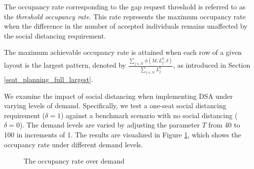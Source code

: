 The occupancy rate corresponding to the gap request threshold is referred to as the \textit{threshold occupancy rate}. This rate represents the maximum occupancy rate when the difference in the number of accepted individuals remains unaffected by the social distancing requirement.

The maximum achievable occupancy rate is attained when each row of a given layout is the largest pattern, denoted by $\frac{\sum_{j \in \mathcal{N}}\phi(M, L_{j}^{0}; \delta)}{\sum_{j \in \mathcal{N}} L_{j}^{0}}$, as introduced in Section \ref{seat_planning_full_largest}.

We examine the impact of social distancing when implementing DSA under varying levels of demand.  Specifically, we test a one-seat social distancing requirement ($\delta = 1$) against a benchmark scenario with no social distancing ($\delta =0$). The demand levels are varied by adjusting the parameter $T$ from 40 to 100 in increments of 1. The results are visualized in Figure \ref{occupancy_rate_demand}, which shows the occupancy rate under different demand levels.




\begin{figure}[h]
  \centering
  \caption{The occupancy rate over demand}
  \label{occupancy_rate_demand}
\end{figure}

